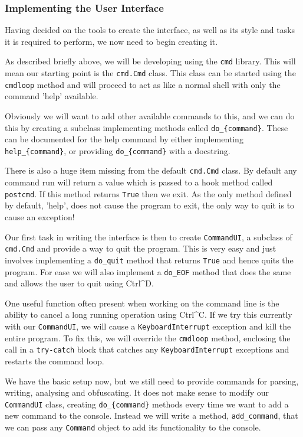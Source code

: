 \documentclass[twoside,a4paper]{report}
\begin{document}
\subsubsection{Implementing the User Interface}

Having decided on the tools to create the interface, as well as its style and tasks it is required to perform, we now need to begin creating it.

As described briefly above, we will be developing using the \texttt{cmd} library. This will mean our starting point is the \texttt{cmd.Cmd} class.
This class can be started using the \texttt{cmdloop} method and will proceed to act as like a normal shell with only the command 'help' available.

Obviously we will want to add other available commands to this, and we can do this by creating a subclass implementing methods called
\texttt{do\_\{command\}}. These can be documented for the help command by either implementing \texttt{help\_\{command\}}, or providing
\texttt{do\_\{command\}} with a docstring.

There is also a huge item missing from the default \texttt{cmd.Cmd} class. By default any command run will return a value which is passed to a
hook method called \texttt{postcmd}. If this method returns \texttt{True} then we exit. As the only method defined by default, 'help', does not
cause the program to exit, the only way to quit is to cause an exception!

Our first task in writing the interface is then to create \texttt{CommandUI}, a subclass of \texttt{cmd.Cmd} and provide a way to quit the program.
This is very easy and just involves implementing a \texttt{do\_quit} method that returns \texttt{True} and hence quits the program. For ease we will
also implement a \texttt{do\_EOF} method that does the same and allows the user to quit using Ctrl\^{}D.

One useful function often present when working on the command line is the ability to cancel a long running operation using Ctrl\^{}C. If we try this
currently with our \texttt{CommandUI}, we will cause a \texttt{KeyboardInterrupt} exception and kill the entire program. To fix this, we will
override the \texttt{cmdloop} method, enclosing the call in a \texttt{try-catch} block that catches any \texttt{KeyboardInterrupt} exceptions and
restarts the command loop.

We have the basic setup now, but we still need to provide commands for parsing, writing, analysing and obfuscating. It does not make sense to modify
our \texttt{CommandUI} class, creating \texttt{do\_\{command\}} methods every time we want to add a new command to the console. Instead we will write
a method, \texttt{add\_command}, that we can pass any \texttt{Command} object to add its functionality to the console.
\end{document}
